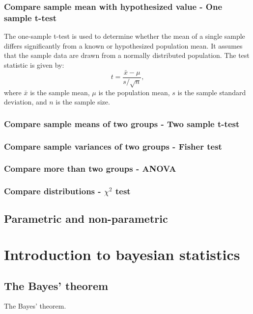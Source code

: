 \documentclass{book}
\begin{document}
\subsection*{Compare sample mean with hypothesized value - One sample t-test}

The one-sample t-test is used to determine whether the mean of a single sample differs significantly from a known or hypothesized population mean. It assumes that the sample data are drawn from a normally distributed population. The test statistic is given by:
\[
    t = \frac{\bar{x} - \mu}{s / \sqrt{n}},
\]
where $\bar{x}$ is the sample mean, $\mu$ is the population mean, $s$ is the sample standard deviation, and $n$ is the sample size.
\newpageifneeded

\subsection*{Compare sample means of two groups - Two sample t-test}

\subsection*{Compare sample variances of two groups - Fisher test}

\subsection*{Compare more than two groups - ANOVA}

\subsection*{Compare distributions - $\chi^{2}$ test}

\section{Parametric and non-parametric}


\chapter{Introduction to bayesian statistics}

\section{The Bayes' theorem}
The Bayes' theorem.
\end{document}
